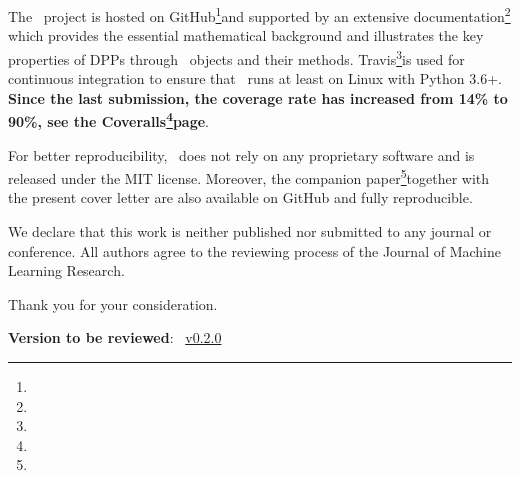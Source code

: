 \documentclass[twoside,11pt]{article}
\begin{document}
The \DPPy\ project is hosted on GitHub\!\footnote{\footGitHubDPPy}and supported by an extensive documentation\!\footnote{\footReadTheDocs} which provides the essential mathematical background and illustrates the key properties of DPPs through \DPPy\ objects and their methods.
\setcounter{footnote}{5}Travis\!\footnote{\footTravis}is used for continuous integration to ensure that \DPPy\ runs at least on Linux with Python 3.6+.
\textbf{Since the last submission, the coverage rate has increased from 14\% to 90\%, see the Coveralls\!\footnote{\footCoveralls}page}.

For better reproducibility, \DPPy\ does not rely on any proprietary software and is released under the MIT license.
Moreover, the companion paper\!\footnote{\footGitHubDPPyPaper}together with the present cover letter are also available on GitHub and fully reproducible.

We declare that this work is neither published nor submitted to any journal or conference.
All authors agree to the reviewing process of the Journal of Machine Learning Research.

Thank you for your consideration.

\textbf{Version to be reviewed}: \DPPy\ \href{https://github.com/guilgautier/DPPy/releases/tag/v0.2.0}{v0.2.0}
\end{document}
